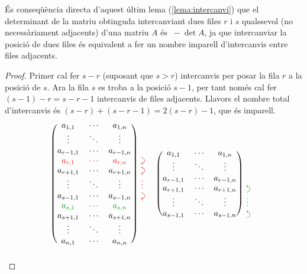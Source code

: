 \begin{s-lema}
\begin{col} \label{col:intercanvi}
	És conseqüència directa d'aquest últim lema (\ref{lema:intercanvi}) que el determinant de la matriu obtinguda intercanviant dues files $r$ i $s$ qualssevol (no necessàriament adjacents) d'una matriu $A$ és $\ -\det A$, ja que intercanviar la posició de dues files és equivalent a fer un nombre imparell d'intercanvis entre files adjacents.
	
		\begin{proof}
		Primer cal fer $s-r$ (suposant que $s>r$) intercanvis per posar la fila $r$ a la posició de $s$. Ara la fila $s$ es troba a la posició $s-1$, per tant només cal fer $(s-1)-r = s-r-1$ intercanvis de files adjacents. Llavors el nombre total d'intercanvis és $(s-r)+(s-r-1) = 2(s-r) - 1$, que és imparell.
		\[
		\begin{blockarray}{cccc}
		\begin{block}{(ccc)*{1}{>{\color{red}}l<{}}}
		a_{1,1}&	\cdots&		a_{1,n}& 		\\
		\vdots&		\ddots&		\vdots& 		\\
		a_{r-1,1}&	\cdots&		a_{r-1,n}&    	\\
		\rd a_{r,1}&\rd\cdots&	\rd a_{r,n}&    \dcarr \\
		a_{r+1,1}&	\cdots&		a_{r+1,n}&    	\dcarr\\
		\vdots&		\ddots&		\vdots& 		\vdots\\
		a_{s-1,1}&	\cdots&		a_{s-1,n}&    	\dcarr \\
		\gre a_{s,1}&\gre\cdots&	\gre a_{s,n}&    \\
		a_{s+1,1}&	\cdots&		a_{s+1,n}&    	\\
		\vdots&		\ddots&		\vdots& 		\\
		a_{n,1}&	\cdots&		a_{n,n}& 		\\	
		\end{block}
		\end{blockarray}
		\quad
		\begin{blockarray}{cccc}
		\begin{block}{(ccc)*{1}{>{\color{ForestGreen}}l<{}}}
		a_{1,1}&	\cdots&		a_{1,n}& 		\\
		\vdots&		\ddots&		\vdots& 		\\
		a_{r-1,1}&	\cdots&		a_{r-1,n}&    	\\
		a_{r+1,1}&	\cdots&		a_{r+1,n}&    	\ucarr\\
		\vdots&		\ddots&		\vdots& 		\vdots\\
		a_{s-1,1}&	\cdots&		a_{s-1,n}&    	\ucarr\\

\end{block}
\end{blockarray}\]
\end{proof}
\end{col}
\end{s-lema}
